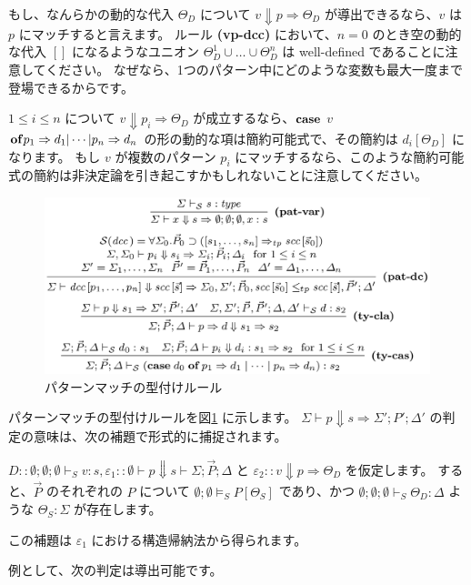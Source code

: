 \documentclass[submit,techreq,noauthor,onecolumn]{ipsj}
\begin{document}
\noindent もし、なんらかの動的な代入 $\Theta_D$ について $v \Downarrow p \Rightarrow \Theta_D$ が導出できるなら、$v$ は $p$ にマッチすると言えます。
ルール {\bf (vp-dcc)} において、$n = 0$ のとき空の動的な代入 $[]$ になるようなユニオン $\Theta^1_D \cup \ldots \cup \Theta^n_D$ は well-defined であることに注意してください。
なぜなら、1つのパターン中にどのような変数も最大一度まで登場できるからです。

$1 \leq i \leq n$ について $v \Downarrow p_i \Rightarrow \Theta_D$ が成立するなら、${\bf case}$ $v$ ${\bf of} p_1 \Rightarrow d_1 |\cdots| p_n \Rightarrow d_n$ の形の動的な項は簡約可能式で、その簡約は $d_i[\Theta_D]$ になります。
もし $v$ が複数のパターン $p_i$ にマッチするなら、このような簡約可能式の簡約は非決定論を引き起こすかもしれないことに注意してください。

\begin{figure}[h]
\centering
\includegraphics[width=12cm]{img/fig6_rules_pattern_match.png}
\caption{パターンマッチの型付けルール}
\label{fig:fig6_rules_pattern_match}
\end{figure}

パターンマッチの型付けルールを図\ref{fig:fig6_rules_pattern_match} に示します。
$\Sigma \vdash p \Downarrow s \Rightarrow \Sigma'; P'; \Delta'$ の判定の意味は、次の補題で形式的に捕捉されます。

$D :: \emptyset;\emptyset;\emptyset \vdash_S v:s, \varepsilon_1::\emptyset \vdash p \Downarrow s \vdash \Sigma; \vec{P}; \Delta$ と $\varepsilon_2 :: v \Downarrow p \Rightarrow \Theta_D$ を仮定します。
すると、$\vec{P}$ のそれぞれの $P$ について $\emptyset;\emptyset \models_S P[\Theta_S]$ であり、かつ $\emptyset;\emptyset;\emptyset \vdash_S \Theta_D : \Delta$ ような $\Theta_S : \Sigma$ が存在します。

この補題は $\varepsilon_1$ における構造帰納法から得られます。

\noindent 例として、次の判定は導出可能です。
\end{document}
